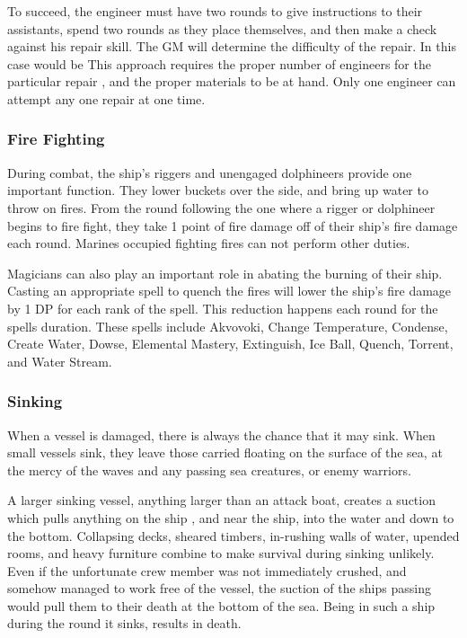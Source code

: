 To succeed, the engineer must have two rounds to give instructions to their assistants, spend two rounds as they place themselves, and then make a check against his repair skill. The GM will determine the difficulty of the repair. In this case would be  This approach requires the proper number of engineers for the particular repair , and the proper materials to be at hand. Only one engineer can attempt any one repair at one time.
\subsubsection{Fire Fighting}
During combat, the ship's riggers and unengaged dolphineers provide one important function. They lower buckets over the side, and bring up water to throw on fires.
From the round following the one where a rigger or dolphineer begins to fire fight, they take 1 point of fire damage off of their ship's fire damage each round. Marines occupied fighting fires can not perform other duties.

Magicians can also play an important role in abating the burning of their ship. Casting an appropriate spell to quench the fires will lower the ship's fire damage by 1 DP for each rank of the spell. This reduction happens each round for the spells duration. These spells include Akvovoki, Change Temperature, Condense, Create Water, Dowse, Elemental Mastery, Extinguish, Ice Ball, Quench, Torrent, and Water Stream.
\subsubsection{Sinking}
When a vessel is damaged, there is always the chance that it may sink. When small vessels sink, they leave those carried floating on the surface of the sea, at the mercy of the waves and any passing sea creatures, or enemy warriors.

A larger sinking vessel, anything larger than an attack boat, creates a suction which pulls anything on the ship , and near the ship, into the water and down to the bottom. Collapsing decks, sheared timbers, in-rushing walls of water, upended rooms, and heavy furniture combine to make survival during sinking unlikely. Even if the unfortunate crew member was not immediately crushed, and somehow managed to work free of the vessel, the suction of the ships passing would pull them to their death at the bottom of the sea. Being in such a ship during the round it sinks, results in death.

